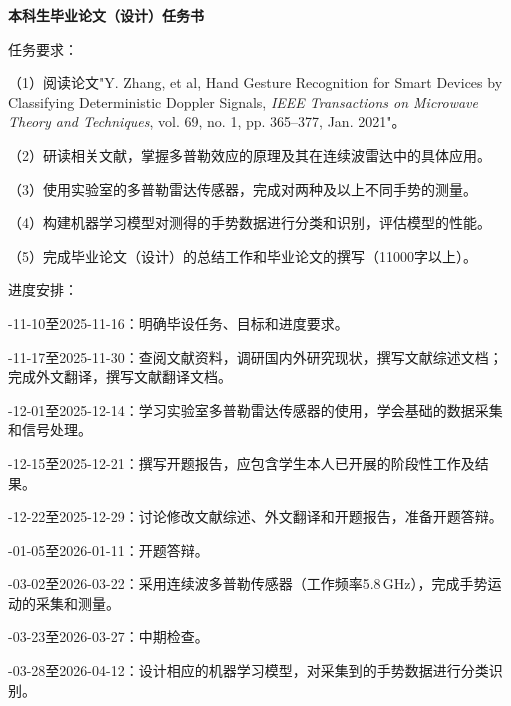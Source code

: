 {
\clearpage
{}
{}
}

\begin{center}
  \bfseries 本科生毕业论文（设计）任务书
\end{center}


\par
{}\par

\noindent 任务要求：

（1）阅读论文"Y. Zhang, et al, Hand Gesture Recognition for Smart Devices by Classifying Deterministic Doppler Signals, \textit{IEEE Transactions on Microwave Theory and Techniques}, vol. 69, no. 1, pp. 365--377, Jan. 2021"。

（2）研读相关文献，掌握多普勒效应的原理及其在连续波雷达中的具体应用。

（3）使用实验室的多普勒雷达传感器，完成对两种及以上不同手势的测量。

（4）构建机器学习模型对测得的手势数据进行分类和识别，评估模型的性能。

（5）完成毕业论文（设计）的总结工作和毕业论文的撰写（11000字以上）。

\vspace{1ex}
\noindent 进度安排：

-11-10至2025-11-16：明确毕设任务、目标和进度要求。

-11-17至2025-11-30：查阅文献资料，调研国内外研究现状，撰写文献综述文档；完成外文翻译，撰写文献翻译文档。

-12-01至2025-12-14：学习实验室多普勒雷达传感器的使用，学会基础的数据采集和信号处理。

-12-15至2025-12-21：撰写开题报告，应包含学生本人已开展的阶段性工作及结果。

-12-22至2025-12-29：讨论修改文献综述、外文翻译和开题报告，准备开题答辩。

-01-05至2026-01-11：开题答辩。

-03-02至2026-03-22：采用连续波多普勒传感器（工作频率5.8\,GHz），完成手势运动的采集和测量。

-03-23至2026-03-27：中期检查。

-03-28至2026-04-12：设计相应的机器学习模型，对采集到的手势数据进行分类识别。


